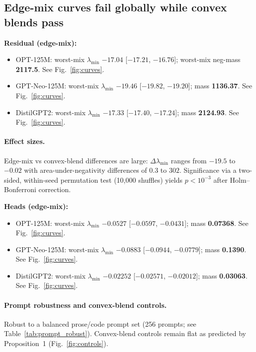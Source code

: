 \documentclass[11pt]{article}
\newcommand{\1}{\mathbf{1}}
\newcommand{\negnum}[1]{\ensuremath{-#1}}
\begin{document}
\subsection{Edge-mix curves fail globally while convex blends pass}
\textbf{Residual (edge-mix):}
\begin{itemize}[leftmargin=1.5em]
\item OPT-125M: worst-mix $\lambda_{\min}$ \textbf{\negnum{17.04}} [\negnum{17.21}, \negnum{16.76}]; worst-mix neg-mass \textbf{2117.5}. See Fig.~\ref{fig:curves}.
\item GPT-Neo-125M: worst-mix $\lambda_{\min}$ \textbf{\negnum{19.46}} [\negnum{19.82}, \negnum{19.20}]; mass \textbf{1136.37}. See Fig.~\ref{fig:curves}.
\item DistilGPT2: worst-mix $\lambda_{\min}$ \textbf{\negnum{17.33}} [\negnum{17.40}, \negnum{17.24}]; mass \textbf{2124.93}. See Fig.~\ref{fig:curves}.
\end{itemize}

\paragraph{Effect sizes.} Edge-mix vs convex-blend differences are large: $\Delta\lambda_{\min}$ ranges from $-19.5$ to $-0.02$ with area-under-negativity differences of $0.3$ to $302$. Significance via a two-sided, within-seed permutation test (10{,}000 shuffles) yields $p<10^{-3}$ after Holm--Bonferroni correction.

\textbf{Heads (edge-mix):}
\begin{itemize}[leftmargin=1.5em]
\item OPT-125M: worst-mix $\lambda_{\min}$ \textbf{\negnum{0.0527}} [\negnum{0.0597}, \negnum{0.0431}]; mass \textbf{0.07368}. See Fig.~\ref{fig:curves}.
\item GPT-Neo-125M: worst-mix $\lambda_{\min}$ \textbf{\negnum{0.0883}} [\negnum{0.0944}, \negnum{0.0779}]; mass \textbf{0.1390}. See Fig.~\ref{fig:curves}.
\item DistilGPT2: worst-mix $\lambda_{\min}$ \textbf{\negnum{0.02252}} [\negnum{0.02571}, \negnum{0.02012}]; mass \textbf{0.03063}. See Fig.~\ref{fig:curves}.
\end{itemize}

\paragraph{Prompt robustness and convex-blend controls.} Robust to a balanced prose/code prompt set (256 prompts; see Table~\ref{tab:prompt_robust}). Convex-blend controls remain flat as predicted by Proposition~1 (Fig.~\ref{fig:controls}).
\end{document}

